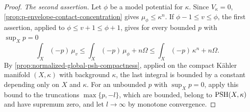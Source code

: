 \begin{proof}
\emph{The second assertion.} Let $\phi$ be a model potential for $\kappa$. Since $V_\kappa=0$, \cref{prop:p-envelope-contact-concentration} gives $\mu_\phi\leq\kappa^n$. If $\phi-1\leq v\leq\phi$, the first assertion, applied to $\phi\leq v+1\leq\phi+1$, gives for every bounded $p$ with $\sup_Xp=0$
\[
 \int_X(-p)\,\mu_v\leq\int_X(-p)\,\mu_\phi+n\Omega
                       \leq\int_X(-p)\,\kappa^n+n\Omega.
\]
By \cref{prop:normalized-global-psh-compactness}, applied on the compact K\"ahler manifold $(X,\kappa)$ with background $\kappa$, the last integral is bounded by a constant depending only on $X$ and $\kappa$. For an unbounded $p$ with $\sup_Xp=0$, apply this bound to the truncations $\max\{p,-l\}$, which are bounded, belong to $\mathrm{PSH}(X,\kappa)$ and have supremum zero, and let $l\to\infty$ by monotone convergence.
\end{proof}

